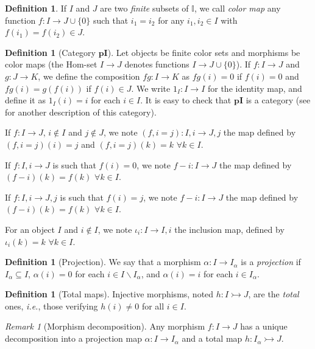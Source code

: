 \documentclass[english]{PaperTools/latex/entcs}
\theoremstyle{plain}
\theoremstyle{definition}
\newtheorem{definition}[theorem]{Definition}
\theoremstyle{remark}
\newtheorem*{remark}{Remark}
\def\pI{\ensuremath{\mathbf{pI}}}
\def\ie{\textit{i.e.}}
\begin{document}
\begin{definition}
  If $I$ and $J$ are two \emph{finite} subsets of $𝕀$, we call
  \emph{color map} any function $f : I → J ∪ \{0\}$ such that
  $i_1 = i_2$ for any $i_1, i_2 ∈ I$ with $f(i_1) = f(i_2) ∈ J$.
\end{definition}

\begin{definition}[Category $\pI{}$]
  \label{def:pI}
  Let objects be finite color sets and morphisms be color maps
  (the Hom-set $I → J$ denotes functions $I → J ∪ \{0\}$).
  If $f : I → J$ and $g : J → K$, we define the composition $fg : I → K$
  as $fg(i) = 0$ if $f(i) = 0$ and $fg(i) = g(f(i))$ if $f(i) ∈ J$.
  We write $1_I : I → I$ for the identity map, and define it as $1_I(i) = i$ for each $i ∈ I$.
  It is easy to check that \pI{} is a category (see \cite[ex.~9.7
  p.~176]{PittsAM:nomsns} for another description of this category).
\end{definition}

If $f : I → J$, $i ∉ I$ and $j ∉ J$, we note
$(f, i = j) : I,i → J,j$ the map defined by $(f,i=j)(i) = j$ and
$(f,i=j)(k) = k$ $∀ k ∈ I$.

If $f : I,i → J$ is such that $f(i) = 0$, we note $f-i : I → J$ the map
defined by $(f-i)(k) = f(k)$ $∀ k ∈ I$.

If $f : I,i → J,j$ is such that $f(i) = j$, we note $f-i : I → J$ the map
defined by $(f-i)(k) = f(k)$ $∀ k ∈ I$.

For an object $I$ and $i ∉ I$, we note $ι_i : I → I,i$ the inclusion
map, defined by $ι_i(k) = k$ $∀ k ∈ I$.

\begin{definition}[Projection]
   We say that a morphism $α : I → I_α$ is a \emph{projection} if
   $I_α ⊆ I$,
   $α(i) = 0$ for each $i ∈ I \backslash I_α$, and
   $α(i) = i$ for each $i ∈ I_α$.
\end{definition}
\begin{definition}[Total maps]
  Injective morphisms, noted $h : I ↣ J$, are the \emph{total} ones, \ie,
  those verifying $h(i) ≠ 0$ for all $i ∈ I$.
\end{definition}
\begin{remark}[Morphism decomposition]
  Any morphism $f : I → J$ has a
  unique decomposition into a projection map
  $α : I → I_α$ and a total map $h : I_α ↣ J$.
%
\end{remark}
\end{document}
